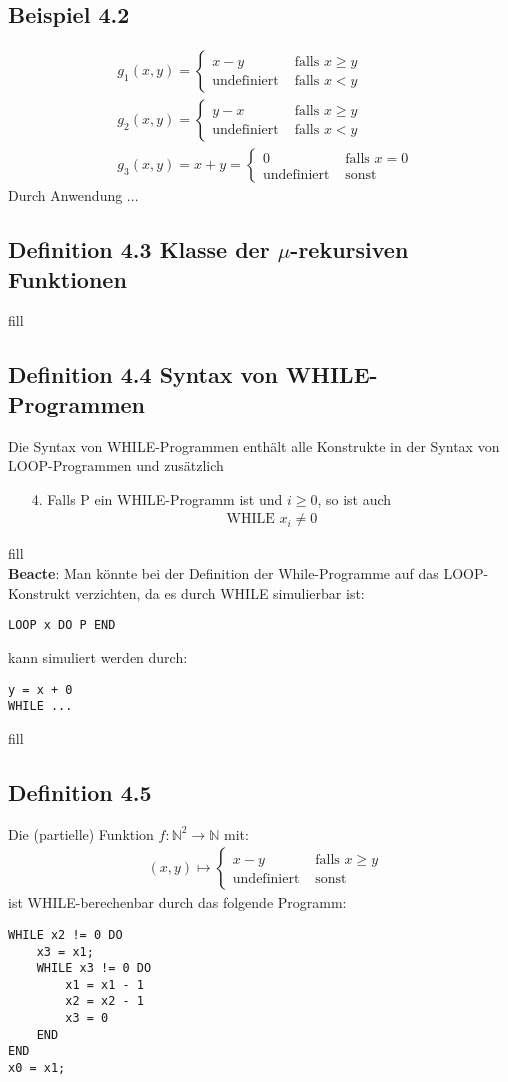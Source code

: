 \subsection{Beispiel 4.2}
\begin{align*}
	&g_1(x,y) = \begin{cases} 
	x-y &\text{ falls } x \ge y\\
	\text{undefiniert} &\text{ falls } x < y \end{cases}\\
	&g_2(x,y) = \begin{cases} 
	y-x &\text{ falls } x \ge y\\
	\text{undefiniert} &\text{ falls } x < y \end{cases}\\
	&g_3(x,y) = x+y =\begin{cases} 
	0 &\text{ falls } x =0\\
	\text{undefiniert} &\text{ sonst} \end{cases}
\end{align*}
Durch Anwendung ...
\subsection{Definition 4.3 Klasse der $\mu$-rekursiven Funktionen}
fill
\subsection{Definition 4.4 Syntax von WHILE-Programmen}
Die Syntax von WHILE-Programmen enthält alle Konstrukte in der Syntax von LOOP-Programmen und zusätzlich
\begin{itemize}
	\item[4.] Falls P ein WHILE-Programm ist und $i\ge 0$, so ist auch 
	\begin{align*}
		\text{WHILE } x_i \neq 0
	\end{align*}
\end{itemize}
fill\\
\textbf{Beacte}: Man könnte bei der Definition der While-Programme auf das LOOP-Konstrukt verzichten, da es durch WHILE simulierbar ist: 
\begin{lstlisting}
LOOP x DO P END
\end{lstlisting}
kann simuliert werden durch:
\begin{lstlisting}
y = x + 0 
WHILE ...
\end{lstlisting}
fill
\subsection{Definition 4.5}
Die (partielle) Funktion $f:\mathbb{N}^2 \to \mathbb{N}$ mit:
\begin{align*}
	&(x,y) \mapsto \begin{cases} x-y &\text{ falls } x\ge y\\
	\text{undefiniert} &\text{ sonst }\end{cases}
\end{align*}
ist WHILE-berechenbar durch das folgende Programm:
\begin{lstlisting}
WHILE x2 != 0 DO
	x3 = x1;
	WHILE x3 != 0 DO
		x1 = x1 - 1
		x2 = x2 - 1
		x3 = 0
	END
END
x0 = x1;
\end{lstlisting}
